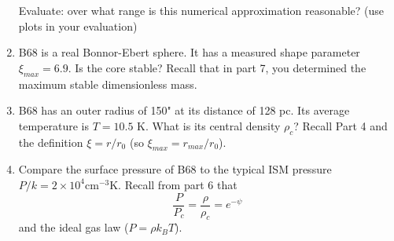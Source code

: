 \documentclass{article}
\begin{document}
\begin{enumerate}
    

    Evaluate: over what range is this numerical approximation reasonable?
    (use plots in your evaluation)

 \item B68 is a real Bonnor-Ebert sphere.  It has a measured shape parameter $\xi_{max}=6.9$.
     Is the core stable?  Recall that in part 7, you determined the maximum stable dimensionless
     mass.

 \item B68 has an outer radius of 150" at its distance of 128 pc.  Its average temperature
     is $T=10.5$ K.  What is its central density $\rho_c$?  Recall Part 4 and the definition $\xi=r/r_0$ (so $\xi_{max} = r_{max}/r_0$).

 \item Compare the surface pressure of B68 to the typical ISM pressure $P/k = 2\times10^4 \mathrm{cm}^{-3} \mathrm{K}$.
     Recall from part 6 that $$\frac{P}{P_c} = \frac{\rho}{\rho_c} = e^{-\psi}$$
    and the ideal gas law ($P = \rho k_B T$).
\end{enumerate}
\end{document}
